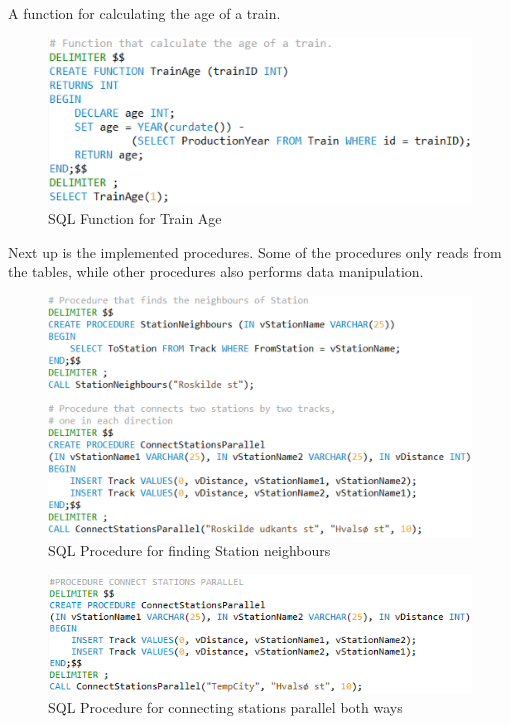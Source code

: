 A function for calculating the age of a train.

\begin{figure}[ht!]
    \centering
    \includegraphics[width=1\textwidth]{img/SQL_FUNCTION_Age}
    \caption{SQL Function for Train Age}
\end{figure}

Next up is the implemented procedures. Some of the procedures only reads from 
the tables, while other procedures also performs data manipulation.

\begin{figure}[ht!]
    \centering
    \includegraphics[width=.7\textwidth]{img/SQL_PROCEDURE_Neighbours}
    \caption{SQL Procedure for finding Station neighbours}
\end{figure}

\begin{figure}[ht!]
    \centering
    \includegraphics[width=1\textwidth]{img/SQL_PROCEDURE_ConnectParallel}
    \caption{SQL Procedure for connecting stations parallel both ways}
\end{figure}

